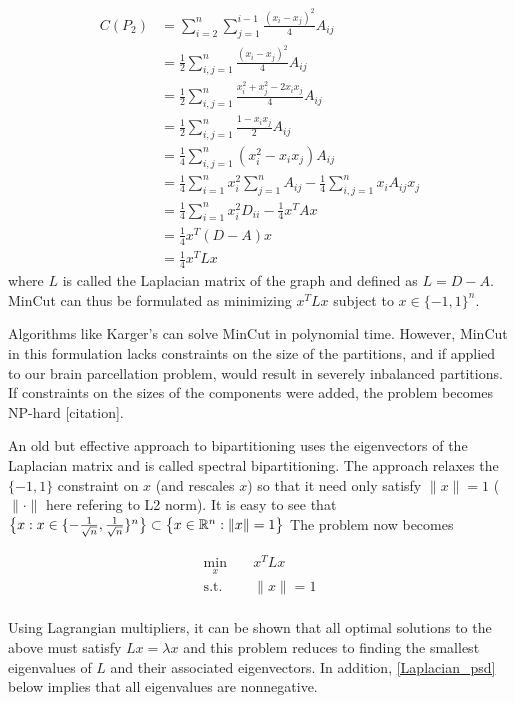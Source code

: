 \begin{align*}
C(P_2)
&= \sum_{i = 2}^n \sum_{j = 1}^{i-1} \frac{(x_i - x_j)^2}{4} A_{ij} \\
&= \frac{1}{2} \sum_{i,j = 1}^n \frac{(x_i - x_j)^2}{4} A_{ij} \\
&= \frac{1}{2} \sum_{i,j = 1}^n
   \frac{x_i^2 + x_j^2 - 2 x_i x_j}{4} A_{ij} \\
&= \frac{1}{2} \sum_{i,j = 1}^n \frac{1 - x_i x_j}{2} A_{ij} \\
&= \frac{1}{4} \sum_{i,j = 1}^n (x_i^2 - x_i x_j) A_{ij} \\
&= \frac{1}{4} \sum_{i = 1}^n x_i^2 \sum_{j = 1}^n A_{ij}
 - \frac{1}{4} \sum_{i,j = 1}^n x_i A_{ij} x_j \\
&= \frac{1}{4} \sum_{i = 1}^n x_i^2 D_{ii} - \frac{1}{4} x^T A x \\
&= \frac{1}{4} x^T (D - A) x \\
&= \frac{1}{4} x^T L x
\end{align*}
where $L$ is called the Laplacian matrix of the graph and defined as
$L = D - A$. MinCut can thus be formulated as minimizing $x^T L x$
subject to $x \in \{-1, 1\}^n$.

Algorithms like Karger's can solve MinCut in polynomial time. However,
MinCut in this formulation lacks constraints on the size of the
partitions, and if applied to our brain parcellation problem, would
result in severely inbalanced partitions. If constraints on the sizes
of the components were added, the problem becomes NP-hard [citation].

An old but effective approach to bipartitioning uses the eigenvectors
of the Laplacian matrix and is called spectral bipartitioning.
The approach relaxes the $\{-1, 1\}$ constraint on $x$ (and rescales
$x$) so that it need only satisfy $\|x\| = 1$ ($\|\cdot\|$ here refering
to L2 norm). It is easy to see that
$\big\{ x : x \in \{-\frac{1}{\sqrt{n}}, \frac{1}{\sqrt{n}}\}^n \big\}
 \subset \big\{ x \in \mathbb{R}^n : \|x\| = 1 \big\}$
The problem now becomes

\begin{equation} \label{spectral_bipartition}
\begin{aligned}
\min_x      &\;& x^T L x \\
\text{s.t.} &\;& \| x \| = 1 \\
\end{aligned}
\end{equation}

Using Lagrangian multipliers, it can be shown that all optimal solutions
to the above must satisfy $L x = \lambda x$ and this problem reduces to
finding the smallest eigenvalues of $L$ and their associated
eigenvectors. In addition, \ref{Laplacian_psd} below implies that all
eigenvalues are nonnegative.

